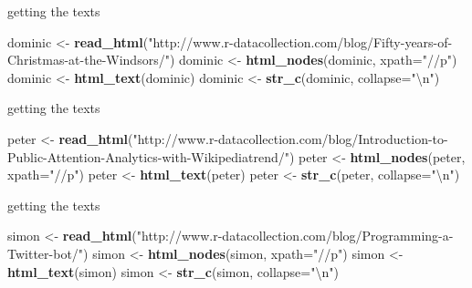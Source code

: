 \documentclass[ignorenonframetext,]{beamer}
\newenvironment{Shaded}{\begin{snugshade}}{\end{snugshade}}
\newcommand{\KeywordTok}[1]{\textcolor[rgb]{0.13,0.29,0.53}{\textbf{{#1}}}}
\newcommand{\DataTypeTok}[1]{\textcolor[rgb]{0.13,0.29,0.53}{{#1}}}
\newcommand{\CharTok}[1]{\textcolor[rgb]{0.31,0.60,0.02}{{#1}}}
\newcommand{\StringTok}[1]{\textcolor[rgb]{0.31,0.60,0.02}{{#1}}}
\newcommand{\NormalTok}[1]{{#1}}
\begin{document}
\begin{frame}[fragile]{getting the texts}

\begin{Shaded}
\begin{Highlighting}[]
\NormalTok{dominic <-}\StringTok{ }\KeywordTok{read_html}\NormalTok{(}\StringTok{"http://www.r-datacollection.com/blog/Fifty-years-of-Christmas-at-the-Windsors/"}\NormalTok{)}
\NormalTok{dominic <-}\StringTok{ }\KeywordTok{html_nodes}\NormalTok{(dominic, }\DataTypeTok{xpath=}\StringTok{"//p"}\NormalTok{)}
\NormalTok{dominic <-}\StringTok{ }\KeywordTok{html_text}\NormalTok{(dominic)}
\NormalTok{dominic <-}\StringTok{ }\KeywordTok{str_c}\NormalTok{(dominic, }\DataTypeTok{collapse=}\StringTok{"}\CharTok{\textbackslash{}n}\StringTok{"}\NormalTok{)}
\end{Highlighting}
\end{Shaded}

\end{frame}

\begin{frame}[fragile]{getting the texts}

\begin{Shaded}
\begin{Highlighting}[]
\NormalTok{peter <-}\StringTok{ }\KeywordTok{read_html}\NormalTok{(}\StringTok{"http://www.r-datacollection.com/blog/Introduction-to-Public-Attention-Analytics-with-Wikipediatrend/"}\NormalTok{)}
\NormalTok{peter <-}\StringTok{ }\KeywordTok{html_nodes}\NormalTok{(peter, }\DataTypeTok{xpath=}\StringTok{"//p"}\NormalTok{)}
\NormalTok{peter <-}\StringTok{ }\KeywordTok{html_text}\NormalTok{(peter)}
\NormalTok{peter <-}\StringTok{ }\KeywordTok{str_c}\NormalTok{(peter, }\DataTypeTok{collapse=}\StringTok{"}\CharTok{\textbackslash{}n}\StringTok{"}\NormalTok{)}
\end{Highlighting}
\end{Shaded}

\end{frame}

\begin{frame}[fragile]{getting the texts}

\begin{Shaded}
\begin{Highlighting}[]
\NormalTok{simon <-}\StringTok{ }\KeywordTok{read_html}\NormalTok{(}\StringTok{"http://www.r-datacollection.com/blog/Programming-a-Twitter-bot/"}\NormalTok{)}
\NormalTok{simon <-}\StringTok{ }\KeywordTok{html_nodes}\NormalTok{(simon, }\DataTypeTok{xpath=}\StringTok{"//p"}\NormalTok{)}
\NormalTok{simon <-}\StringTok{ }\KeywordTok{html_text}\NormalTok{(simon)}
\NormalTok{simon <-}\StringTok{ }\KeywordTok{str_c}\NormalTok{(simon, }\DataTypeTok{collapse=}\StringTok{"}\CharTok{\textbackslash{}n}\StringTok{"}\NormalTok{)}
\end{Highlighting}
\end{Shaded}

\end{frame}
\end{document}
